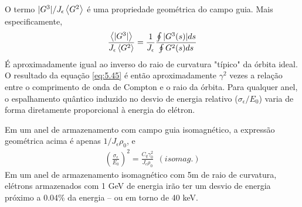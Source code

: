 O termo $|G^3|/J_\epsilon \left< G^2 \right>$ é uma propriedade geométrica do campo guia. Mais especificamente,
\begin{align}
	\frac{\left< |G^3| \right>}{J_\epsilon\left< G^2 \right>} = \frac{1}{J_\epsilon}\frac{\oint |G^3(s)|ds}{\oint G^2(s)ds}
\end{align}
É aproximadamente igual ao inverso do raio de curvatura "típico" da órbita ideal. O resultado da equação \eqref{eq:5.45} é então aproximadamente $\gamma^2$ vezes a relação entre o comprimento de onda de Compton e o raio da órbita. Para qualquer anel, o espalhamento quântico induzido no desvio de energia relativo ($\sigma_\epsilon/E_0$) varia de forma diretamente proporcional à energia do elétron.

Em um anel de armazenamento com campo guia isomagnético, a expressão geométrica acima é apenas $1/J_\epsilon \rho_0$, e
\begin{align}
	\left(\frac{\sigma_\epsilon}{E_0}\right)^2 = \frac{C_q \gamma_0^2}{J_\epsilon \rho_0}\ \ (isomag.)\label{eq:5.48}
\end{align}
Em um anel de armazenamento isomagnético com 5m de raio de curvatura, elétrons armazenados com 1 GeV de energia irão ter um desvio de energia próximo a 0.04\% da energia -- ou em torno de 40 keV.